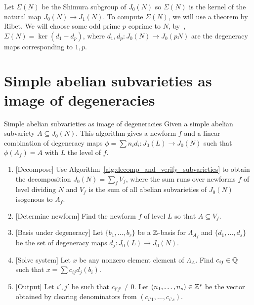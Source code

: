 \documentclass[11pt, proquest]{uwthesis}
\begin{document}
Let $\Sigma(N)$ be the Shimura subgroup of $J_0(N)$ so $\Sigma(N)$ is the
kernel of the natural map $J_0(N)\to J_1(N)$. To compute $\Sigma(N)$, we will
use a theorem by Ribet. We will choose some odd prime $p$ coprime to $N$,
by~\cite[Prop. 1]{ribet:raising}, $\Sigma(N)=\ker(d_1-d_p)$, where
$d_1,d_p:J_0(N)\to J_0(pN)$ are the degeneracy maps corresponding to $1,p$.

\section{Simple abelian subvarieties as image of degeneracies}
\begin{algorithm}{Simple abelian subvarieties as image of degeneracies}%
    \label{alg:simple_degen}
    Given a simple abelian subvariety $A\subseteq J_0(N)$. This algorithm
    gives a newform $f$ and a linear combination of degeneracy maps
    $\phi=\sum n_i d_i:J_0(L)\to J_0(N)$ such that $\phi(A_f)=A$ with $L$ the
    level of $f$.
    \begin{enumerate}
        \item{} [Decompose]
            Use Algorithm~\ref{alg:decomp_and_verify_subvarieties} to obtain
            the decomposition $J_0(N)=\sum_f V_f$, where the sum runs over
            newforms $f$ of level dividing $N$ and $V_f$ is the sum of all
            abelian subvarieties of $J_0(N)$ isogenous to $A_f$.
        \item{} [Determine newform]
            Find the newform $f$ of level $L$ so that $A\subseteq V_f$.
        \item{} [Basis under degeneracy]
            Let $\{b_1,\ldots,b_r\}$ be a $\mathbb{Z}$-basis for $\Lambda_{A_f}$ and
            $\{d_1,\ldots,d_s\}$ be the set of degeneracy maps $d_j:J_0(L)\to
            J_0(N)$.
        \item{} [Solve system]
            Let $x$ be any nonzero element element of $\Lambda_A$. Find
            $c_{ij}\in \mathbb{Q}$ such that $x=\sum c_{ij} d_j(b_i)$.
        \item{} [Output]
            Let $i', j'$ be such that $c_{i'j'}\neq 0$. Let
            $(n_1,\ldots,n_s)\in \mathbb{Z}^s$ be the vector obtained by
            clearing denominators from $(c_{i'1},\ldots,c_{i's})$.
    \end{enumerate}
\end{algorithm}
\end{document}
